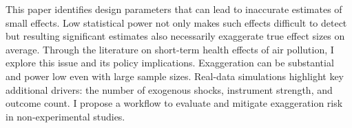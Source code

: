 This paper identifies design parameters that can lead to inaccurate estimates of small effects. Low statistical power not only makes such effects difficult to detect but resulting significant estimates also necessarily exaggerate true effect sizes on average. Through the literature on short-term health effects of air pollution, I explore this issue and its policy implications. Exaggeration can be substantial and power low even with large sample sizes. Real-data simulations highlight key additional drivers: the number of exogenous shocks, instrument strength, and outcome count. I propose a workflow to evaluate and mitigate exaggeration risk in non-experimental studies.